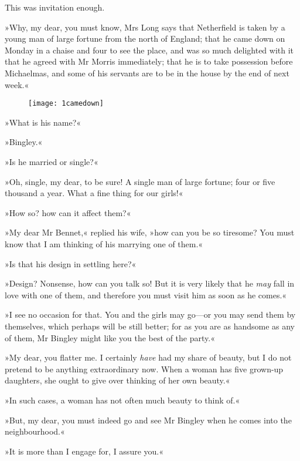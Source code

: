 

This was invitation enough.

»Why, my dear, you must know, Mrs Long says that Netherfield is taken by a young man of large fortune from the north of England; that he came down on Monday in a chaise and four to see the place, and was so much delighted with it that he agreed with Mr Morris immediately; that he is to take possession before Michaelmas, and some of his servants are to be in the house by the end of next week.«

\begin{figure}[tbh]
\centering
\texttt{[image: 1camedown]}
\end{figure}

»What is his name?«

»Bingley.«

»Is he married or single?«

»Oh, single, my dear, to be sure! A single man of large fortune; four or five thousand a year. What a fine thing for our girls!«

»How so? how can it affect them?«

»My dear Mr Bennet,« replied his wife, »how can you be so tiresome? You must know that I am thinking of his marrying one of them.«

»Is that his design in settling here?«

»Design? Nonsense, how can you talk so! But it is very likely that he \textit{may} fall in love with one of them, and therefore you must visit him as soon as he comes.«

»I see no occasion for that. You and the girls may go—or you may send them by themselves, which perhaps will be still better; for as you are as handsome as any of them, Mr Bingley might like you the best of the party.«

»My dear, you flatter me. I certainly \textit{have} had my share of beauty, but I do not pretend to be anything extraordinary now. When a woman has five grown-up daughters, she ought to give over thinking of her own beauty.«

»In such cases, a woman has not often much beauty to think of.«

»But, my dear, you must indeed go and see Mr Bingley when he comes into the neighbourhood.«

»It is more than I engage for, I assure you.«

